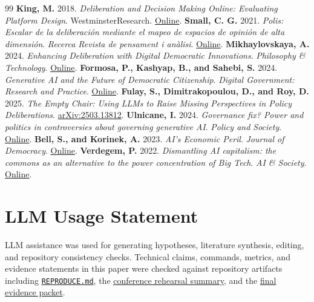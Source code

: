 \documentclass[11pt]{article}
\newcommand{\repobase}{https://github.com/davidkimai/acp}
\newcommand{\repofile}[2]{\href{\repobase/blob/main/#1}{\nolinkurl{#2}}}
\begin{document}
\begin{thebibliography}{99}
     \textbf{King, M.} 2018. \textit{Deliberation and Decision Making Online: Evaluating Platform Design}. WestminsterResearch. \href{https://doi.org/10.34737/qqyvx}{Online}.
     \textbf{Small, C. G.} 2021. \textit{Polis: Escalar de la deliberaci\'on mediante el mapeo de espacios de opini\'on de alta dimensi\'on}. \textit{Recerca Revista de pensament i an\`alisi}. \href{https://doi.org/10.6035/recerca.5516}{Online}.
     \textbf{Mikhaylovskaya, A.} 2024. \textit{Enhancing Deliberation with Digital Democratic Innovations}. \textit{Philosophy \& Technology}. \href{https://doi.org/10.1007/s13347-023-00692-x}{Online}.
     \textbf{Formosa, P., Kashyap, B., and Sahebi, S.} 2024. \textit{Generative AI and the Future of Democratic Citizenship}. \textit{Digital Government: Research and Practice}. \href{https://doi.org/10.1145/3674844}{Online}.
     \textbf{Fulay, S., Dimitrakopoulou, D., and Roy, D.} 2025. \textit{The Empty Chair: Using LLMs to Raise Missing Perspectives in Policy Deliberations}. \href{https://doi.org/10.48550/arxiv.2503.13812}{arXiv:2503.13812}.
     \textbf{Ulnicane, I.} 2024. \textit{Governance fix? Power and politics in controversies about governing generative AI}. \textit{Policy and Society}. \href{https://doi.org/10.1093/polsoc/puae022}{Online}.
     \textbf{Bell, S., and Korinek, A.} 2023. \textit{AI's Economic Peril}. \textit{Journal of Democracy}. \href{https://doi.org/10.1353/jod.2023.a907696}{Online}.
     \textbf{Verdegem, P.} 2022. \textit{Dismantling AI capitalism: the commons as an alternative to the power concentration of Big Tech}. \textit{AI \& Society}. \href{https://doi.org/10.1007/s00146-022-01437-8}{Online}.
\end{thebibliography}

\section*{LLM Usage Statement}

LLM assistance was used for generating hypotheses, literature synthesis, editing, and repository consistency checks. Technical claims, commands, metrics, and evidence statements in this paper were checked against repository artifacts including \repofile{REPRODUCE.md}{REPRODUCE.md}, the \href{https://github.com/davidkimai/acp/blob/main/artifacts/conference/rehearsal/rehearsal-summary.json}{conference rehearsal summary}, and the \href{https://github.com/davidkimai/acp/tree/main/artifacts/evals/skills/final}{final evidence packet}.
\end{document}
